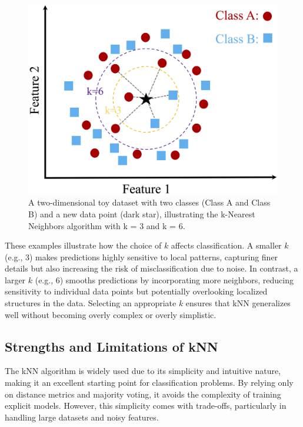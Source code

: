 \documentclass[
]{book}
\theoremstyle{definition}
\theoremstyle{definition}
\theoremstyle{definition}
\theoremstyle{definition}
\theoremstyle{remark}
\begin{document}
\begin{figure}

{\centering \includegraphics[width=0.75\linewidth]{images/ch7_knn} 

}

\caption{A two-dimensional toy dataset with two classes (Class A and Class B) and a new data point (dark star), illustrating the k-Nearest Neighbors algorithm with k = 3 and k = 6.}\label{fig:knn-image}
\end{figure}

These examples illustrate how the choice of \(k\) affects classification. A smaller \(k\) (e.g., 3) makes predictions highly sensitive to local patterns, capturing finer details but also increasing the risk of misclassification due to noise. In contrast, a larger \(k\) (e.g., 6) smooths predictions by incorporating more neighbors, reducing sensitivity to individual data points but potentially overlooking localized structures in the data. Selecting an appropriate \(k\) ensures that kNN generalizes well without becoming overly complex or overly simplistic.

\subsection*{Strengths and Limitations of kNN}\label{strengths-and-limitations-of-knn}

The kNN algorithm is widely used due to its simplicity and intuitive nature, making it an excellent starting point for classification problems. By relying only on distance metrics and majority voting, it avoids the complexity of training explicit models. However, this simplicity comes with trade-offs, particularly in handling large datasets and noisy features.
\end{document}
